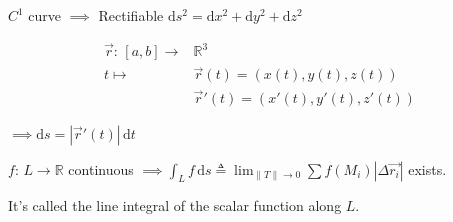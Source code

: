 $C^1$ curve $\implies$ Rectifiable $\mathrm{d}s^2=\mathrm{d}x^2+\mathrm{d}y^2+\mathrm{d}z^2$

\begin{align*}
    \overrightarrow{r}:\,[a,b]\to & \mathbb{R}^3                               \\
    t\mapsto                      & \overrightarrow{r}(t)=(x(t),y(t),z(t))     \\
                                  & \overrightarrow{r}'(t)=(x'(t),y'(t),z'(t))
\end{align*}

$\implies\mathrm{d}s=\left|\overrightarrow{r}'(t)\right|\,\mathrm{d}t$

$f:\,L\to\mathbb{R}$ continuous $\implies\int_L f\,\mathrm{d}s\triangleq\lim_{\|T\|\to 0}\sum f(M_i)\left|\Delta\overrightarrow{r_i}\right|$ exists.

It's called the line integral of the scalar function along $L$.

